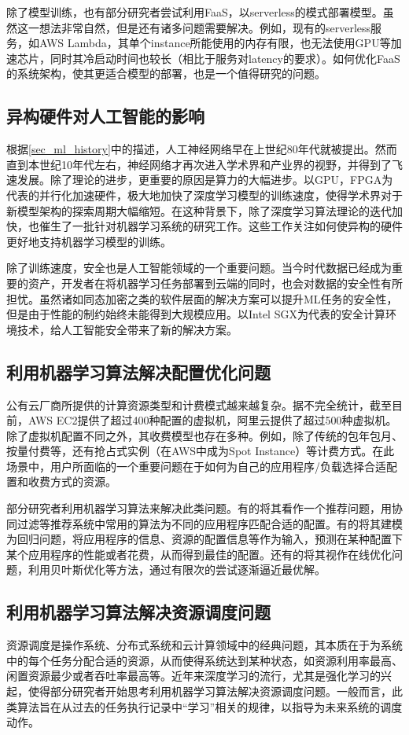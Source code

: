 除了模型训练，也有部分研究者尝试利用FaaS，以serverless的模式部署模型。虽然这一想法非常自然，但是还有诸多问题需要解决。例如，现有的serverless服务，如AWS Lambda，其单个instance所能使用的内存有限，也无法使用GPU等加速芯片，同时其冷启动时间也较长（相比于服务对latency的要求）。如何优化FaaS的系统架构，使其更适合模型的部署，也是一个值得研究的问题。

\subsection{异构硬件对人工智能的影响}
根据\ref{sec_ml_history}中的描述，人工神经网络早在上世纪80年代就被提出。然而直到本世纪10年代左右，神经网络才再次进入学术界和产业界的视野，并得到了飞速发展。除了理论的进步，更重要的原因是算力的大幅进步。以GPU，FPGA为代表的并行化加速硬件，极大地加快了深度学习模型的训练速度，使得学术界对于新模型架构的探索周期大幅缩短。在这种背景下，除了深度学习算法理论的迭代加快，也催生了一批针对机器学习系统的研究工作。这些工作关注如何使异构的硬件更好地支持机器学习模型的训练。

除了训练速度，安全也是人工智能领域的一个重要问题。当今时代数据已经成为重要的资产，开发者在将机器学习任务部署到云端的同时，也会对数据的安全性有所担忧。虽然诸如同态加密之类的软件层面的解决方案可以提升ML任务的安全性，但是由于性能的制约始终未能得到大规模应用。以Intel SGX\parencite{costan2016intel}为代表的安全计算环境技术，给人工智能安全带来了新的解决方案。

\subsection{利用机器学习算法解决配置优化问题}
公有云厂商所提供的计算资源类型和计费模式越来越复杂。据不完全统计，截至目前，AWS EC2提供了超过400种配置的虚拟机，阿里云提供了超过500种虚拟机。除了虚拟机配置不同之外，其收费模型也存在多种。例如，除了传统的包年包月、按量付费等，还有抢占式实例（在AWS中成为Spot Instance）\parencite{awsspot}等计费方式。在此场景中，用户所面临的一个重要问题在于如何为自己的应用程序/负载选择合适配置和收费方式的资源。

部分研究者利用机器学习算法来解决此类问题。有的将其看作一个推荐问题\parencite{klimovic2018selecta}，用协同过滤等推荐系统中常用的算法为不同的应用程序匹配合适的配置。有的将其建模为回归问题\parencite{yadwadkar2017selecting,venkataraman2016ernest,moradi2019performance,zheng2019online}，将应用程序的信息、资源的配置信息等作为输入，预测在某种配置下某个应用程序的性能或者花费，从而得到最佳的配置。还有的将其视作在线优化问题\parencite{alipourfard2017cherrypick,casimiro2019lynceus}，利用贝叶斯优化等方法，通过有限次的尝试逐渐逼近最优解。

\subsection{利用机器学习算法解决资源调度问题}
资源调度是操作系统、分布式系统和云计算领域中的经典问题，其本质在于为系统中的每个任务分配合适的资源，从而使得系统达到某种状态，如资源利用率最高、闲置资源最少或者吞吐率最高等。近年来深度学习的流行，尤其是强化学习的兴起，使得部分研究者开始思考利用机器学习算法解决资源调度问题\parencite{delimitrou2014quasar,mao2019learning,chung2018stratus}。一般而言，此类算法旨在从过去的任务执行记录中“学习”相关的规律，以指导为未来系统的调度动作。
